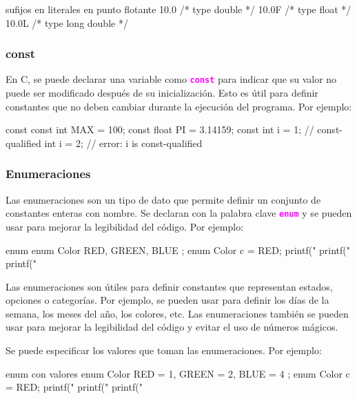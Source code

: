 \documentclass[]{scrartcl}
\newcommand{\hl}[1]{\textcolor{magenta}{\textbf{\texttt{#1}}}}
\begin{document}
\begin{cbox}{sufijos en literales en punto flotante}
  10.0   /* type double */
  10.0F  /* type float */
  10.0L  /* type long double */
\end{cbox}


\subsubsection*{const}

En C, se puede declarar una variable como \hl{const} para indicar que su valor no puede ser modificado después de su inicialización. Esto es útil para definir constantes que no deben cambiar durante la ejecución del programa. Por ejemplo:

\begin{cbox}{const}
  const int MAX = 100;
  const float PI = 3.14159;
  const int i = 1; // const-qualified int
  i = 2;           // error: i is const-qualified
\end{cbox}

\subsubsection*{Enumeraciones}

Las enumeraciones son un tipo de dato que permite definir un conjunto de constantes enteras con nombre. Se declaran con la palabra clave \hl{enum} y se pueden usar para mejorar la legibilidad del código. Por ejemplo:

\begin{cbox}{enum}
  enum Color { RED, GREEN, BLUE };
  enum Color c = RED;
  printf("%
  printf("%
  printf("%
\end{cbox}

Las enumeraciones son útiles para definir constantes que representan estados, opciones o categorías. Por ejemplo, se pueden usar para definir los días de la semana, los meses del año, los colores, etc. Las enumeraciones también se pueden usar para mejorar la legibilidad del código y evitar el uso de números mágicos.

Se puede especificar los valores que toman las enumeraciones. Por ejemplo:
\begin{cbox}{enum con valores}
  enum Color { RED = 1, GREEN = 2, BLUE = 4 };
  enum Color c = RED;
  printf("%
  printf("%
  printf("%
\end{cbox}
\end{document}
